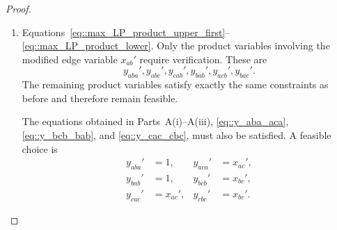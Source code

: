 \begin{proof}
\begin{enumerate}[label=\Alph*.]
\begin{enumerate}[label=(\roman*)]
        \item Consider $y_{bab}'$ and $y_{bcb}'$. By Equation~\eqref{eq::y_bab_bcb}, $y_{bab}'+y_{bcb}'=x_{ab}'+x_{bc}'$ which is satisfied by the selection
          \[
          y_{bab}'=x_{ab}',\quad y_{bcb}'=x_{bc}'. 
          \] 
          Equation~\eqref{eq::max_LP_symmetry_x} and Equation~\eqref{eq::max_LP_x_upper_bound} giving $x_{ab}' \leq 1$, $x_{bc}' \leq 1$ gives
          \[
          y_{bab}'=x_{ab}' \leq x_{ba}',\quad y_{bab}'=x_{ab}'\leq x_{ab}', \quad y_{bab}'=x_{ab}' \geq x_{ba}'+x_{ab}'-1
          \]
          \[
          y_{bcb}'=x_{bc}' \leq x_{bc},\quad y_{bcb}'=x_{bc}' \leq x_{cb}', \quad y_{bcb}'=x_{bc}' \geq x_{bc}'+x_{cb}'-1
          \]
          Hence Equations~\eqref{eq::max_LP_product_upper_first}--\eqref{eq::max_LP_product_lower} are satisfied.
        \item Consider $y_{abc}'$. Since $x_{ab}'=1$, Equations~\eqref{eq::max_LP_product_upper_first}--\eqref{eq::max_LP_product_lower} give
          \[
          y_{abc}'\ge x_{ab}'+x_{bc}'-1 = x_{bc}', \quad  y_{abc}' \leq x_{ab}', \quad  y_{abc}' \leq x_{bc}'.
          \]
          If $x_{bc}' < 1$, then $y_{abc}' = x_{bc}'$ satisfies all constraints and if $x_{bc}'=1$ then $y_{abc}' = 1$ satisfies all constraints.  
        \item Consider $y_{acb}'$. Since neither $x_{ac}'$ nor $x_{cb}'$ has been modified, all three product constraints are unchanged and therefore remain satisfied.
      \end{enumerate}
    \item Equations~\eqref{eq::max_LP_product_upper_first}--\eqref{eq::max_LP_product_lower}.
      Only the product variables involving the modified edge variable
      $x_{ab}'$ require verification. These are
      \[
      y_{aba}', y_{abc}', y_{cab}', y_{bab}', y_{acb}', y_{bac}'. 
      \]
      The remaining product variables satisfy exactly the same constraints as
      before and therefore remain feasible.

      The equations obtained in Parts~A(i)--A(iii),
      \eqref{eq::y_aba_aca},
      \eqref{eq::y_bcb_bab},
      and
      \eqref{eq::y_cac_cbc},
      must also be satisfied. A feasible choice is
      \[
      \begin{aligned}
      y_{aba}'&=1, &
      y_{aca}'&=x_{ac}',\\
      y_{bab}'&=1, &
      y_{bcb}'&=x_{bc}',\\
      y_{cac}'&=x_{ac}', &
      y_{cbc}'&=x_{bc}'.
      \end{aligned}
      \]


\end{enumerate}
\end{proof}
